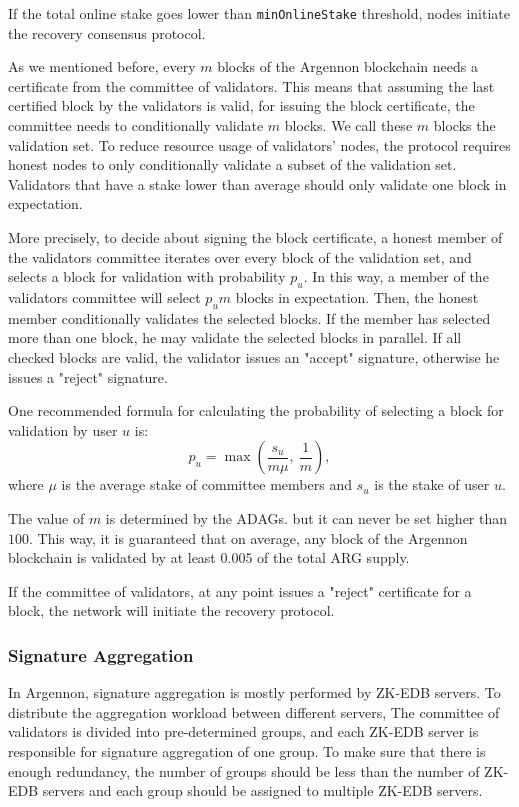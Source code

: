 If the total online stake goes lower than \texttt{minOnlineStake} threshold, nodes initiate the recovery
consensus protocol.

As we mentioned before, every $m$ blocks of the Argennon blockchain needs a certificate from the committee
of validators. This means that assuming the last certified block by the validators is valid, for issuing the block
certificate, the committee needs to conditionally validate $m$ blocks. We call these $m$ blocks the
validation set. To reduce resource usage of validators' nodes, the protocol requires honest nodes to only
conditionally validate a subset of the validation set. Validators that have a stake lower than
average should only validate one block in expectation.

More precisely, to decide about signing the block certificate, a honest member of the validators
committee iterates over every block of the validation set, and selects a block for validation with
probability $p_u$. In this way, a member of the validators committee will select $p_{u}m$ blocks in expectation.
Then, the honest member conditionally validates the selected blocks. If the member has selected more than one block,
he may validate the selected blocks in parallel.
If all checked blocks are valid, the validator issues an "accept"
signature, otherwise he issues a "reject" signature.

One recommended formula for calculating the probability of selecting a block for validation by user $u$ is:
\begin{equation}
    p_u=\max\left(\frac{s_u}{m\mu},\ \frac{1}{m}\right),\label{eq:block-selection}
\end{equation}
where $\mu$ is the average stake of committee members and $s_u$ is the stake of user $u$.

The value of $m$ is determined by the ADAGs. but it can never be set higher than $100$. This way, it is guaranteed
that on average, any block of the Argennon blockchain is validated by at least $0.005$ of the total ARG supply.

If the committee of validators, at any point issues a "reject" certificate for a block, the network will initiate the
recovery protocol.

\subsubsection{Signature Aggregation}

In Argennon, signature aggregation is mostly performed by ZK-EDB servers. To distribute the aggregation workload
between different servers, The committee of validators is divided into pre-determined groups, and each ZK-EDB
server is responsible for signature aggregation of one group. To make sure that there is enough redundancy, the number
of groups should be less than the number of ZK-EDB servers and each group should be assigned to
multiple ZK-EDB servers.

